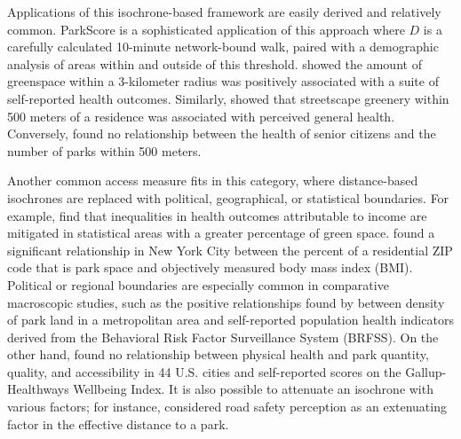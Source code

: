 \documentclass[shortAfour,sageh.bst]{sagej}
\begin{document}
Applications of this isochrone-based framework are easily derived and
relatively common. ParkScore \citep{parkscore2019} is a sophisticated
application of this approach where \(D\) is a carefully calculated
10-minute network-bound walk, paired with a demographic analysis of
areas within and outside of this threshold. \citet{devries2003natural}
showed the amount of greenspace within a 3-kilometer radius was
positively associated with a suite of self-reported health outcomes.
Similarly, \citet{devries2013streetscape} showed that streetscape
greenery within 500 meters of a residence was associated with perceived
general health. Conversely, \citet{carlson2012interactions} found no
relationship between the health of senior citizens and the number of
parks within 500 meters.

Another common access measure fits in this category, where
distance-based isochrones are replaced with political, geographical, or
statistical boundaries. For example, \citet{Mitchell2008} find that inequalities
in health outcomes attributable to income are mitigated in statistical areas
with a greater percentage of green space. \citet{Stark2014} found a significant
relationship in New York City between the percent of a residential ZIP code that
is park space and objectively measured body mass index (BMI). Political or
regional boundaries are
especially common in comparative macroscopic studies, such as the
positive relationships found by \citet{West2012} between density of park
land in a metropolitan area and self-reported population health
indicators derived from the Behavioral Risk Factor Surveillance System
(BRFSS). On the other hand, \citet{Larson2016} found no relationship
between physical health and park quantity, quality, and accessibility in
44 U.S. cities and self-reported scores on the Gallup-Healthways
Wellbeing Index. It is also possible to attenuate an isochrone with
various factors; for instance, \citet{Dias2019} considered road safety
perception as an extenuating factor in the effective distance to a park.
\end{document}
